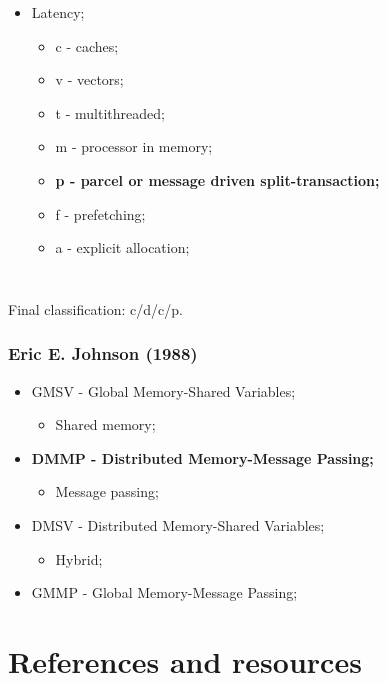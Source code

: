 \documentclass{beamer}
\begin{document}
\begin{frame}
\begin{columns}
    \begin{itemize}
      \item Latency;
            \begin{itemize}
              \item c - caches;
              \item v - vectors;
              \item t - multithreaded;
              \item m - processor in memory;
              \item \textbf{p - parcel or message driven split-transaction;}
              \item f - prefetching;
              \item a - explicit allocation;
            \end{itemize}
    \end{itemize}
  \end{columns}
  \bigbreak
  \bigbreak
  Final classification: c/d/c/p.
\end{frame}

\begin{frame}
  \frametitle{Eric E. Johnson (1988)}
  \begin{itemize}
    \item GMSV - Global Memory-Shared Variables;
          \begin{itemize}
            \item Shared memory;
          \end{itemize}
    \item \textbf{DMMP - Distributed Memory-Message Passing;}
          \begin{itemize}
            \item Message passing;
          \end{itemize}
    \item DMSV - Distributed Memory-Shared Variables;
          \begin{itemize}
            \item Hybrid;
          \end{itemize}
    \item GMMP - Global Memory-Message Passing;
  \end{itemize}
\end{frame}


\section{References and resources}
\end{document}
